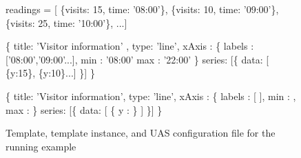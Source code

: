 \begin{figure*}
\begin{minipage}[c]{6cm}
\begin{minipage}[c]{6cm}
\begin{code}
readings = [
   \{visits: 15, time: '08:00'\}, 
   \{visits: 10, time: '09:00'\},
   \{visits: 25, time: '10:00'\},  ...]
\end{code}
\vspace*{-0.4cm}
\label{figure:running-example:query-result}
\vspace*{0.3cm}
\end{minipage}
%
\vspace*{0.6cm}
\end{minipage}
\hspace{2cm}
\begin{minipage}[c]{6cm}
\begin{minipage}[c]{7.5cm}
\begin{code}
   \{
    title: 'Visitor information' ,
    type: 'line',
    xAxis : \{ 
      labels : ['08:00','09:00'...],
      min : '08:00'
      max : '22:00'
    \}
    series: [\{ data: [ \{y:15\}, \{y:10\}...] \}]
  \} 
\end{code}
\vspace*{-0.4cm}
\vspace*{0.3cm}
\label{figure:running-example:unit-body}
\end{minipage}
\begin{minipage}[c]{7.5cm}
\begin{code}
   \{
    title: 'Visitor information',
    type: 'line',
    xAxis : \{ 
      labels : [
        ],
      min : ,
      max : 
    \}
    series: [\{
      data: [ 
          \{
            y  : 
          \}
         ]
    \}]
  \} 
\end{code}
\vspace*{-0.3cm}
\vspace*{0cm}
\label{figure:first-running-example:main-template}
\end{minipage}
\end{minipage}
\vspace*{-0.3cm}
\caption{Template, template instance, and UAS configuration file for the running example}
\vspace*{-0.3cm}
\end{figure*}


